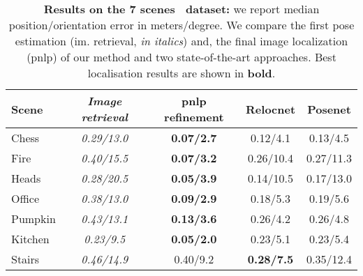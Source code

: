 \begin{table}
\centering

\begin{footnotesize}
\renewcommand{\arraystretch}{1.0}
\begin{tabular}{l | c c | c c }
		Scene	&	\textit{Image retrieval} & \ac{pnlp} refinement & Relocnet \citep{Balntas2018} & Posenet \citep{Kendall2017} \\
	\hline	
	\hline	
		Chess 	&  {\textit{0.29/13.0}} 	& \textbf{{0.07/2.7}} &  0.12/4.1 & 0.13/4.5	\\
	Fire	&  {\textit{0.40/15.5}}	&  \textbf{{0.07/3.2}} & 0.26/10.4 &	0.27/11.3	\\
	Heads	&  {\textit{0.28/20.5}}  &  \textbf{{0.05/3.9}} & 0.14/10.5 & 0.17/13.0	\\
	Office  &  {\textit{0.38/13.0}}  & \textbf{{0.09/2.9}} &  0.18/5.3 & 0.19/5.6		\\
	Pumpkin &  {\textit{0.43/13.1}}	& \textbf{{0.13/3.6}} &  0.26/4.2 & 0.26/4.8		\\
	Kitchen &  {\textit{0.23/9.5}}   & \textbf{{0.05/2.0}} &  0.23/5.1 & 0.23/5.4		\\
	Stairs  &  {\textit{0.46/14.9}}	& {0.40/9.2} &  \textbf{0.28/7.5} & 0.35/12.4	\\
	\hline	
\end{tabular}
\end{footnotesize}

\caption[Results on 7 scenes dataset]{\label{tab:7_scenes}\textbf{ Results on the \textbf{7 scenes}~\citep{Shotton2013} dataset:} we report median position/orientation error in meters/degree. We compare the first pose estimation (im. retrieval, \textit{in italics}) and, the final image localization (\ac{pnlp}) of our method and two state-of-the-art approaches. Best localisation results are shown in \textbf{bold}.}

\end{table}
